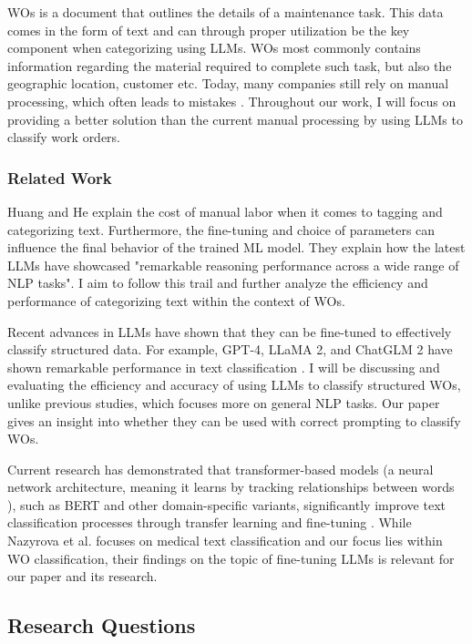 WOs is a document that outlines the details of a maintenance task.
This data comes in the form of text and can through proper utilization be the
key component when categorizing using LLMs.
WOs most commonly contains information regarding the material required to
complete such task, but also the geographic location, customer etc.
Today, many companies still rely on manual processing, which often leads to
mistakes \cite{ibm2023} \cite{li2024}.
Throughout our work, I will focus on providing a better solution than the
current manual processing by using LLMs to classify work orders.

\subsubsection{Related Work}

Huang and He \cite{huang2024} explain the cost of manual labor when it comes to
tagging and categorizing text.
Furthermore, the fine-tuning and choice of parameters can influence the final
behavior of the trained ML model.
They explain how the latest LLMs have showcased "remarkable reasoning
performance across a wide range of NLP tasks".
I aim to follow this trail and further analyze the efficiency and performance
of categorizing text within the context of WOs.

\bigskip
Recent advances in LLMs have shown that they can be fine-tuned to effectively
classify structured data.
For example, GPT-4, LLaMA 2, and ChatGLM 2 have shown remarkable performance in
text classification \cite{zhang2024}.
I will be discussing and evaluating the efficiency and accuracy of using LLMs
to classify structured WOs, unlike previous studies, which focuses more on
general NLP tasks.
Our paper gives an insight into whether they can be used with correct prompting
to classify WOs.

\bigskip
Current research has demonstrated that transformer-based models
(a neural network architecture, meaning it learns by tracking relationships
between words \cite{merritt2022}),
such as BERT and other domain-specific variants, significantly improve text
classification processes through transfer learning and fine-tuning
\cite{nazyrova2024}.
While Nazyrova et al. focuses on medical text classification and our focus lies
within WO classification, their findings on the topic of fine-tuning LLMs is
relevant for our paper and its research.

\subsection{Research Questions}


